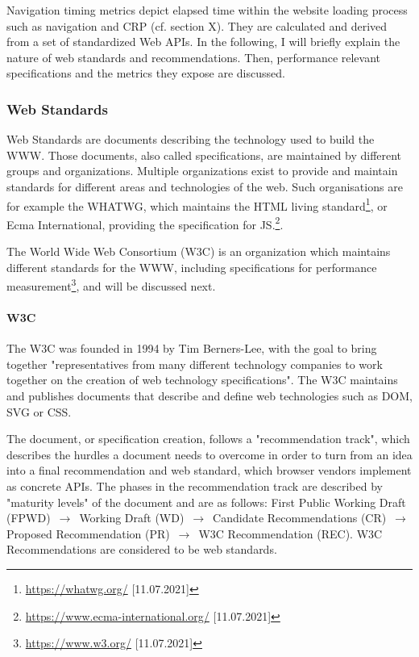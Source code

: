 Navigation timing metrics depict elapsed time within the website loading process such as navigation and CRP (cf.  section X).
They are calculated and derived from a set of standardized Web APIs.
In the following, I will briefly explain the nature of web standards and recommendations.
Then, performance relevant specifications and the metrics they expose are discussed.


\subsubsection{Web Standards}

Web Standards are documents describing the technology used to build the WWW. %
Those documents, also called specifications, are maintained by different groups and organizations.
Multiple organizations exist to provide and maintain standards for different areas and technologies of the web.
Such organisations are for example the WHATWG, which maintains the HTML living standard\footnote{\url{https://whatwg.org/} [11.07.2021]}, or Ecma International, providing the specification for JS.\footnote{\url{https://www.ecma-international.org/} [11.07.2021]}.

The World Wide Web Consortium (W3C) is an organization which maintains different standards for the WWW, including specifications for performance measurement\footnote{\url{https://www.w3.org/} [11.07.2021]}, and will be discussed next.


\paragraph{W3C}


The W3C was founded in 1994 by Tim Berners-Lee, with the goal to bring together "representatives from many different technology companies to work together on the creation of web technology specifications". %
The W3C maintains and publishes documents that describe and define web technologies such as DOM, SVG or CSS. %



The document, or specification creation, follows a "recommendation track", which describes the hurdles a document needs to overcome in order to turn from an idea into a final recommendation and web standard, which browser vendors implement as concrete APIs. %
The phases in the recommendation track are described by "maturity levels" of the document and are as follows:
First Public Working Draft (FPWD) $\,\to\,$ Working Draft (WD) $\,\to\,$ Candidate Recommendations (CR) $\,\to\,$ Proposed Recommendation (PR) $\,\to\,$ W3C Recommendation (REC).  %
W3C Recommendations are considered to be web standards. %

